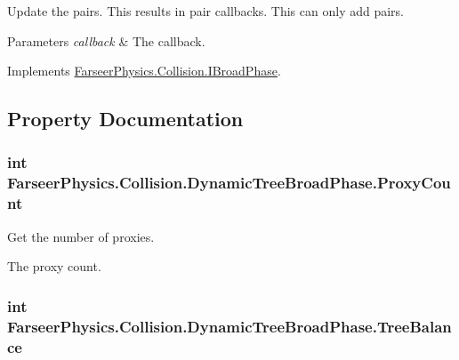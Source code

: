 Update the pairs. This results in pair callbacks. This can only add pairs. 


\begin{DoxyParams}{Parameters}
{\em callback} & The callback.\\
\hline
\end{DoxyParams}


Implements \hyperlink{interface_farseer_physics_1_1_collision_1_1_i_broad_phase_a1830419926dabd7a7bf8bd729e18e587}{Farseer\+Physics.\+Collision.\+I\+Broad\+Phase}.



\subsection{Property Documentation}
\hypertarget{class_farseer_physics_1_1_collision_1_1_dynamic_tree_broad_phase_a3d2c33f76707c70fe4c8fc3964c50264}{
\subsubsection[{Proxy\+Count}]{\setlength{\rightskip}{0pt plus 5cm}int Farseer\+Physics.\+Collision.\+Dynamic\+Tree\+Broad\+Phase.\+Proxy\+Count\hspace{0.3cm}{\ttfamily [get]}}}\label{class_farseer_physics_1_1_collision_1_1_dynamic_tree_broad_phase_a3d2c33f76707c70fe4c8fc3964c50264}


Get the number of proxies. 

The proxy count.\hypertarget{class_farseer_physics_1_1_collision_1_1_dynamic_tree_broad_phase_a606b1f77d415f9a37c47a7c7e47a0039}{
\subsubsection[{Tree\+Balance}]{\setlength{\rightskip}{0pt plus 5cm}int Farseer\+Physics.\+Collision.\+Dynamic\+Tree\+Broad\+Phase.\+Tree\+Balance\hspace{0.3cm}{\ttfamily [get]}}}\label{class_farseer_physics_1_1_collision_1_1_dynamic_tree_broad_phase_a606b1f77d415f9a37c47a7c7e47a0039}


